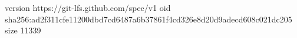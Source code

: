 version https://git-lfs.github.com/spec/v1
oid sha256:ad2f311cfe11200dbd7cd6487a6b37861f4cd326e8d20d9adecd608c021dc205
size 11339
